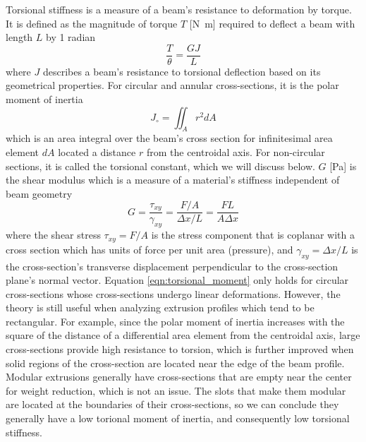 Torsional stiffness is a measure of a beam's resistance to deformation by torque. It is defined as the magnitude of torque $T$ [\si{\newton.\metre}] required to deflect a beam with length $L$ by 1 radian
%
\begin{equation}
    \frac{T}{\theta} = \frac{GJ}{L}
\end{equation}
%
where $J$ describes a beam's resistance to torsional deflection based on its geometrical properties. For circular and annular cross-sections, it is the polar moment of inertia
%
\begin{equation}
    J_\circ = \iint_{A} r^2 dA
    \label{eqn:torsional_moment}
\end{equation}
%
which is an area integral over the beam's cross section for infinitesimal area element $dA$ located a distance $r$ from the centroidal axis. For non-circular sections, it is called the torsional constant, which we will discuss below. $G$ [\si{\pascal}] is the shear modulus which is a measure of a material's stiffness independent of beam geometry
%
\begin{equation}
    G = \frac{\tau_{xy}}{\gamma_{xy}} = \frac{F/A}{\Delta x / L} = \frac{F L}{A \Delta x}
\end{equation}
%
where the shear stress $\tau_{xy} = F/A$ is the stress component that is coplanar with a cross section which has units of force per unit area (pressure), and $\gamma_{xy} = \Delta x / L$ is the cross-section's transverse displacement perpendicular to the cross-section plane's normal vector. Equation \ref{eqn:torsional_moment} only holds for circular cross-sections whose cross-sections undergo linear deformations. However, the theory is still useful when analyzing extrusion profiles which tend to be rectangular. For example, since the polar moment of inertia increases with the square of the distance of a differential area element from the centroidal axis, large cross-sections provide high resistance to torsion, which is further improved when solid regions of the cross-section are located near the edge of the beam profile. Modular extrusions generally have cross-sections that are empty near the center for weight reduction, which is not an issue. The slots that make them modular are located at the boundaries of their cross-sections, so we can conclude they generally have a low torional moment of inertia, and consequently low torsional stiffness.


